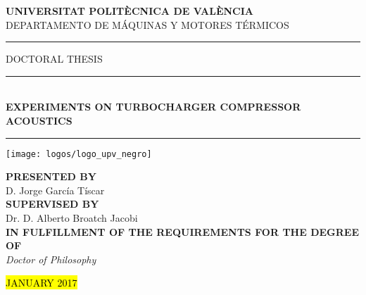\documentclass[final,twoside,11pt]{book}
\numberwithin{equation}{section}
\numberwithin{figure}{chapter}
\numberwithin{table}{chapter}
\begin{document}
\frontmatter

%

\enlargethispage{5cm}
\thispagestyle{empty}
\begin{center}
\Large\cabin\textbf{UNIVERSITAT POLITÈCNICA DE VALÈNCIA}\\[1mm]
\large DEPARTAMENTO DE MÁQUINAS Y MOTORES TÉRMICOS\\
\vspace{1cm}

\rule[0.3\baselineskip]{3.8cm}{0.4pt}
\noindent\cabin\large{\hspace{2mm}DOCTORAL THESIS\hspace{2mm}}
\rule[0.3\baselineskip]{3.8cm}{0.4pt}
\vspace{2mm}\\
\huge\textbf{EXPERIMENTS ON TURBOCHARGER COMPRESSOR ACOUSTICS}\\
\vspace{-2.5mm}
\rule{\textwidth}{0.4pt}
\vspace{1cm}

\texttt{[image: logos/logo\_upv\_negro]}

\vspace{1.3cm}

{\normalsize\bfseries\cabincondensed PRESENTED BY}\\
\rm\Large D. Jorge García Tíscar\\[4mm]
{\normalsize\bfseries\cabincondensed SUPERVISED BY}\\
\rm\Large Dr. D. Alberto Broatch Jacobi\\[8mm]

{\normalsize\bfseries\cabincondensed IN FULFILLMENT OF THE REQUIREMENTS FOR THE DEGREE OF}\\[2mm]
\it\Large Doctor of Philosophy

\vspace{1.2cm}

\footnotesize\rm\cabin \hl{JANUARY 2017}
\end{center}
\cleardoublepage
\end{document}
